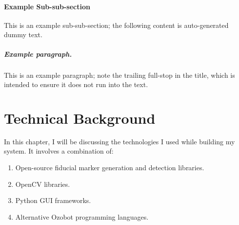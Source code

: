 \documentclass[oneside,%
                    author={Malak Hajji},
                    degree={BSc},
                    title={Designing An Accessible Computational Toolkit For Students},
                  subtitle={With Mixed Visual Abilities}]{dissertation}
\begin{document}
\subsubsection{Example Sub-sub-section}

This is an example sub-sub-section;
the following content is auto-generated dummy text.
\lipsum

\paragraph{Example paragraph.}

This is an example paragraph; note the trailing full-stop in the title,
which is intended to ensure it does not run into the text.


\chapter{Technical Background}
\label{chap:evaluation}



\noindent
In this chapter, I will be discussing the technologies I used while building my system. It involves a combination of:

\begin{enumerate}
\item Open-source fiducial marker generation and detection libraries.
\item OpenCV libraries.
\item Python GUI frameworks. 
\item Alternative Ozobot programming languages.
\end{enumerate}
\end{document}
